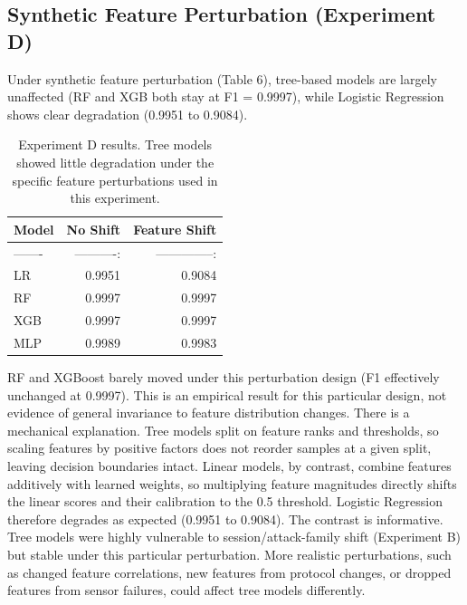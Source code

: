 \documentclass[10pt]{article}
\begin{document}
\subsection{Synthetic Feature Perturbation (Experiment D)}
Under synthetic feature perturbation (Table 6), tree-based models are largely unaffected (RF and XGB both stay at F1 = 0.9997), while Logistic Regression shows clear degradation (0.9951 to 0.9084).
\begin{table}[ht]
\centering
\small
\setlength{\tabcolsep}{5pt}
\caption{Experiment D results. Tree models showed little degradation under the specific feature perturbations used in this experiment.}
\begin{tabular}{l r r}
\toprule
Model & No Shift & Feature Shift \\
\midrule
------- & ----------: & --------------: \\
LR & 0.9951 & 0.9084 \\
RF & 0.9997 & 0.9997 \\
XGB & 0.9997 & 0.9997 \\
MLP & 0.9989 & 0.9983 \\
\bottomrule
\end{tabular}
\end{table}
RF and XGBoost barely moved under this perturbation design (F1 effectively unchanged at 0.9997). This is an empirical result for this particular design, not evidence of general invariance to feature distribution changes. There is a mechanical explanation. Tree models split on feature ranks and thresholds, so scaling features by positive factors does not reorder samples at a given split, leaving decision boundaries intact. Linear models, by contrast, combine features additively with learned weights, so multiplying feature magnitudes directly shifts the linear scores and their calibration to the 0.5 threshold. Logistic Regression therefore degrades as expected (0.9951 to 0.9084).
The contrast is informative. Tree models were highly vulnerable to session/attack-family shift (Experiment B) but stable under this particular perturbation. More realistic perturbations, such as changed feature correlations, new features from protocol changes, or dropped features from sensor failures, could affect tree models differently.
\end{document}
